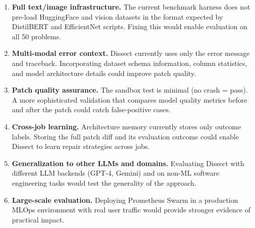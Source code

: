 \documentclass[conference]{IEEEtran}
\begin{document}
\begin{enumerate}
  \item \textbf{Full text/image infrastructure.} The current benchmark harness does not
  pre-load HuggingFace and vision datasets in the format expected by DistilBERT and
  EfficientNet scripts. Fixing this would enable evaluation on all 50 problems.

  \item \textbf{Multi-modal error context.} Dissect currently uses only the error message
  and traceback. Incorporating dataset schema information, column statistics, and model
  architecture details could improve patch quality.

  \item \textbf{Patch quality assurance.} The sandbox test is minimal (no crash = pass).
  A more sophisticated validation that compares model quality metrics before and after the
  patch could catch false-positive cases.

  \item \textbf{Cross-job learning.} Architecture memory currently stores only outcome
  labels. Storing the full patch diff and its evaluation outcome could enable Dissect to
  learn repair strategies across jobs.

  \item \textbf{Generalization to other LLMs and domains.} Evaluating Dissect with
  different LLM backends (GPT-4, Gemini) and on non-ML software engineering tasks would
  test the generality of the approach.

  \item \textbf{Large-scale evaluation.} Deploying Prometheus Swarm in a production MLOps
  environment with real user traffic would provide stronger evidence of practical impact.
\end{enumerate}

\balance
\end{document}
